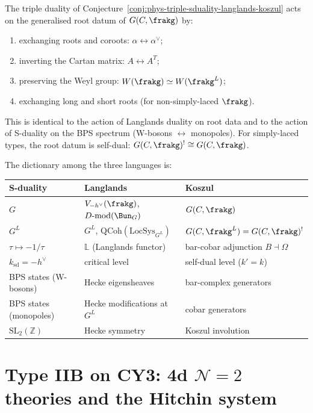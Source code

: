 \begin{conjecture}
\label{prop:phys-root-datum-exchange}
\ClaimStatusConjectured
The triple duality of Conjecture~\ref{conj:phys-triple-sduality-langlands-koszul}
acts on the generalised root datum of $G(C,\frakg)$ by:
\begin{enumerate}[label=(\roman*)]
\item exchanging roots and coroots: $\alpha \leftrightarrow \alpha^\vee$;
\item inverting the Cartan matrix: $A \leftrightarrow A^T$;
\item preserving the Weyl group: $W(\frakg) \simeq W(\frakg^L)$;
\item exchanging long and short roots (for non-simply-laced $\frakg$).
\end{enumerate}
This is identical to the action of Langlands duality on root data and to the
action of S-duality on the BPS spectrum (W-bosons $\leftrightarrow$ monopoles).
For simply-laced types, the root datum is self-dual: $G(C,\frakg)^! \cong G(C,\frakg)$.
\end{conjecture}

The dictionary among the three languages is:
\begin{center}
\renewcommand{\arraystretch}{1.4}
\begin{tabular}{lll}
\hline
\textbf{S-duality} & \textbf{Langlands} & \textbf{Koszul} \\
\hline
$G$ & $V_{-h^\vee}(\frakg)$, $D\text{-mod}(\Bun_G)$ & $G(C,\frakg)$ \\
$G^L$ & $G^L$, $\mathrm{QCoh}(\mathrm{LocSys}_{G^L})$ & $G(C,\frakg^L) = G(C,\frakg)^!$ \\
$\tau \mapsto -1/\tau$ & $\mathbb{L}$ (Langlands functor) & bar-cobar adjunction $B \dashv \Omega$ \\
$k_{\mathrm{sd}} = -h^\vee$ & critical level & self-dual level ($k' = k$) \\
BPS states (W-bosons) & Hecke eigensheaves & bar-complex generators \\
BPS states (monopoles) & Hecke modifications at $G^L$ & cobar generators \\
$\mathrm{SL}_2(\mathbb{Z})$ & Hecke symmetry & Koszul involution \\
\hline
\end{tabular}
\end{center}


\section{Type IIB on CY3: 4d \texorpdfstring{$\mathcal{N}=2$}{N=2} theories and the Hitchin system}
\label{sec:phys-iib-cy3-hitchin}


